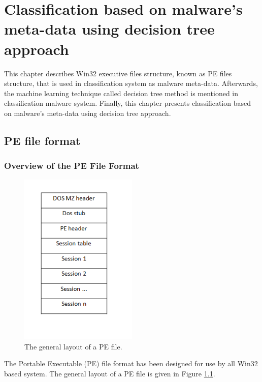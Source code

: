\chapter{Classification based on malware's meta-data using decision tree approach}\label{chap:4}
%
%
This chapter describes Win32 executive files structure, known as PE files structure, that is used in classification system as malware meta-data. Afterwards, the machine learning technique called decision tree method is mentioned in classification malware system. Finally, this chapter presents classification based on malware's meta-data using decision tree approach. 

\section{PE file format\cite{peheaderci}}
\subsection{Overview of the PE File Format}
\begin{figure}[h!]
\centering
\includegraphics[width=0.5\textwidth]{graph/pefiles.png}
\caption{The general layout of a PE file.}
\label{fig:pefiles}
\end{figure}

The Portable Executable (PE) file format has been designed for use by all Win32 based system. The general layout of a PE file is given in Figure \ref{fig:pefiles}. 

